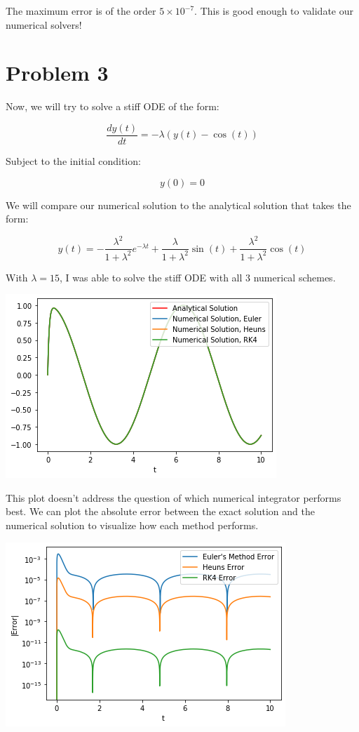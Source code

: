 \documentclass[12pt, letterpaper]{article}
\begin{document}
The maximum error is of the order $5 \times 10^{-7}$. This is good enough to validate our numerical solvers!

\section*{Problem 3}

Now, we will try to solve a stiff ODE of the form: 

\begin{equation}
\frac{dy(t)}{dt} = -\lambda (y(t) - \cos(t))
\end{equation}

Subject to the initial condition: 

\begin{equation}
y(0) = 0
\end{equation}

We will compare our numerical solution to the analytical solution that takes the form:

\begin{equation}
y(t) = -\frac{\lambda^2}{1 + \lambda^2} e^{-\lambda t} + \frac{\lambda}{1 + \lambda^2} \sin(t) + \frac{\lambda^2}{1 + \lambda^2} \cos(t)
\end{equation}

With $\lambda = 15$, I was able to solve the stiff ODE with all 3 numerical schemes. 

\includegraphics{stiff_EQ.png}

This plot doesn't address the question of which numerical integrator performs best. We can plot the absolute error between the exact solution and the numerical solution to visualize how each method performs. 

\includegraphics{stiff_EQ_error.png}
\end{document}
